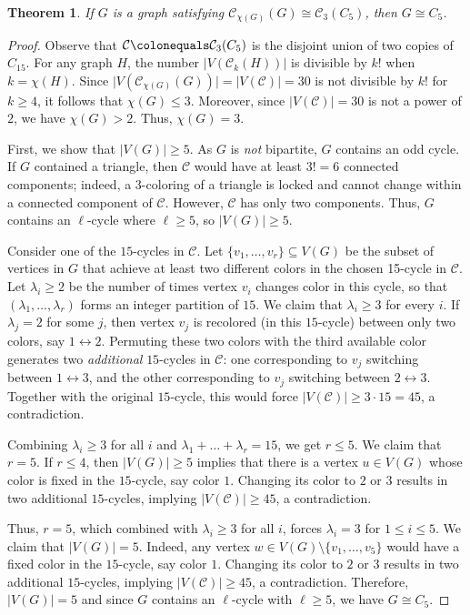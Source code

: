 \documentclass{amsart}
\theoremstyle{hypothesisstyle}
\newtheorem{theorem}{Theorem}[section]
\theoremstyle{definition}
\theoremstyle{remark}
\numberwithin{equation}{section}
\newcommand{\abs}[1]{\lvert#1\rvert}
\newcommand{\C}{\mathcal C}
\begin{document}
\begin{theorem}\label{thm:C3(C5)}
If $G$ is a graph satisfying $\mathcal{C}_{\chi(G)}(G)\cong\mathcal{C}_3(C_5)$, then $G\cong C_5$.
\end{theorem}
\begin{proof}
    Observe that $\C \colonequals \mathcal{C}_3(C_5)$ is the disjoint union of two copies of $C_{15}$. For any graph $H$, the number $\abs{V(\C_k(H))}$ is divisible by $k!$ when $k=\chi(H)$. Since $\abs{V(\C_{\chi(G)}(G))}=\abs{V(\C)}=30$ is not divisible by $k!$ for $k\geq 4$, it follows that $\chi(G)\leq 3$. Moreover, since $\abs{V(\C)}=30$ is not a power of $2$, we have $\chi(G)>2$. Thus, $\chi(G)=3$. 

     First, we show that $|V(G)|\geq 5$. As $G$ is \emph{not} bipartite, $G$ contains an odd cycle. If $G$ contained a triangle, then $\C$ would have at least $3!=6$ connected components; indeed, a $3$-coloring of a triangle is locked and cannot change within a connected component of $\C$. However, $\C$ has only two components. Thus, $G$ contains an $\ell$-cycle where $\ell\geq 5$, so $|V(G)|\geq 5$.
    
    Consider one of the $15$-cycles in $\C$. Let $\{v_1, \dots, v_r\}\subseteq V(G)$ be the subset of vertices in $G$ that achieve at least two different colors in the chosen 15-cycle in $\C$. Let $\lambda_i\geq 2$ be the number of times vertex $v_i$ changes color in this cycle, so that $(\lambda_1, \dots, \lambda_r)$ forms an integer partition of $15$. We claim that $\lambda_i\geq 3$ for every $i$. If $\lambda_j=2$ for some $j$, then vertex $v_j$ is recolored (in this $15$-cycle) between only two colors, say $1\leftrightarrow 2$. Permuting these two colors with the third available color generates two \emph{additional} $15$-cycles in $\mathcal{C}$: one corresponding to $v_j$ switching between $1\leftrightarrow 3$, and the other corresponding to $v_j$ switching between $2\leftrightarrow 3$. Together with the original $15$-cycle, this would force $|V(\mathcal{C})|\ge 3\cdot 15 = 45$, a contradiction.
    
   Combining $\lambda_i\geq 3$ for all $i$ and $\lambda_1+\dots + \lambda_r=15$, we get $r\leq 5$. We claim that $r=5$. If $r\leq 4$, then $|V(G)|\geq 5$ implies that there is a vertex $u\in V(G)$ whose color is fixed in the $15$-cycle, say color $1$. Changing its color to $2$ or $3$ results in two additional $15$-cycles, implying $|V(\C)|\geq 45$, a contradiction. 

Thus, $r=5$, which combined with $\lambda_i\geq 3$ for all $i$, forces $\lambda_i=3$ for $1\leq i\leq 5$. We claim that $|V(G)|=5$. Indeed, any vertex $w\in V(G)\setminus \{v_1, \dots, v_5\}$ would have a fixed color in the $15$-cycle, say color $1$. Changing its color to $2$ or $3$ results in two additional $15$-cycles, implying $|V(\C)|\geq 45$, a contradiction. Therefore, $|V(G)|=5$ and since $G$ contains an $\ell$-cycle with $\ell\geq 5$, we have $G\cong C_5$. \end{proof}
\end{document}
